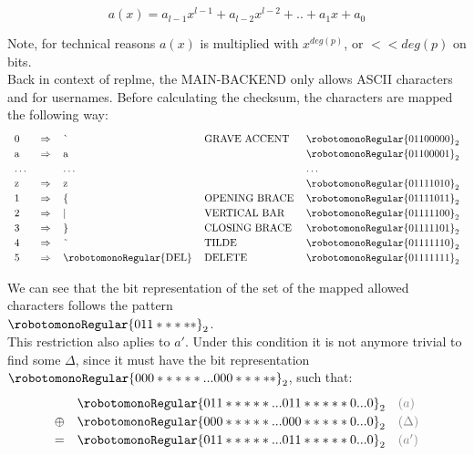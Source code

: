\documentclass[10pt]{article}
\begin{document}
\begin{equation}
	a(x) = a_{l-1}x^{l-1}+a_{l-2}x^{l-2}+..+a_1x+a_0
\end{equation}

\vspace*{.4cm}
Note, for technical reasons $a(x)$ is multiplied with $x^{deg(p)}$, or $<< deg(p)$ on bits. \\

Back in context of replme, the MAIN-BACKEND only allows ASCII characters  and  for usernames. Before calculating the checksum, the characters are mapped the following way:
\begin{equation}
	\label{eq:char-mapping}
	\begin{tabular}{l l l l l}
		0       & $\Rightarrow$ & \`\                     & GRAVE ACCENT  & $\robotomonoRegular{01100000}_2$ \\
		a       & $\Rightarrow$ & a                       &               & $\robotomonoRegular{01100001}_2$ \\
		$\dots$ &               & $\dots$                 &               & $\dots$                          \\
		z       & $\Rightarrow$ & z                       &               & $\robotomonoRegular{01111010}_2$ \\
		1       & $\Rightarrow$ & \{                      & OPENING BRACE & $\robotomonoRegular{01111011}_2$ \\
		2       & $\Rightarrow$ & |                       & VERTICAL BAR  & $\robotomonoRegular{01111100}_2$ \\
		3       & $\Rightarrow$ & \}                      & CLOSING BRACE & $\robotomonoRegular{01111101}_2$ \\
		4       & $\Rightarrow$ & \~{}                    & TILDE         & $\robotomonoRegular{01111110}_2$ \\
		5       & $\Rightarrow$ & \robotomonoRegular{DEL} & DELETE        & $\robotomonoRegular{01111111}_2$
	\end{tabular}
\end{equation}

We can see that the bit representation of the set of the mapped allowed characters follows the pattern\\ $\robotomonoRegular{011*****}_2$. \\

This restriction also aplies to $a'$. Under this condition it is not anymore trivial to find some $\Delta$, since it must have the bit representation $\robotomonoRegular{000*****...000*****}_2$, such that:
\begin{equation}
	\def\arraystretch{1.2}
	\begin{array}{lll}
		       & \robotomonoRegular{011*****...011***** 0...0}_2 & \color{gray}(a)      \\
		\oplus & \robotomonoRegular{000*****...000***** 0...0}_2 & \color{gray}(\Delta) \\
		=      & \robotomonoRegular{011*****...011***** 0...0}_2 & \color{gray}(a')     \\
	\end{array}
\end{equation}
\end{document}

